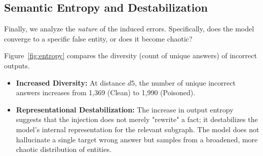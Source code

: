 \subsection{Semantic Entropy and Destabilization}
\label{subsec:entropy}

Finally, we analyze the \textit{nature} of the induced errors. Specifically, does the model converge to a specific false entity, or does it become chaotic?

Figure~\ref{fig:entropy} compares the diversity (count of unique answers) of incorrect outputs.
\begin{itemize}
    \item \textbf{Increased Diversity:} At distance $d5$, the number of unique incorrect answers increases from 1,369 (Clean) to 1,990 (Poisoned).
    \item \textbf{Representational Destabilization:} The increase in output entropy suggests that the injection does not merely "rewrite" a fact; it destabilizes the model's internal representation for the relevant subgraph. The model does not hallucinate a single target wrong answer but samples from a broadened, more chaotic distribution of entities.
\end{itemize}

